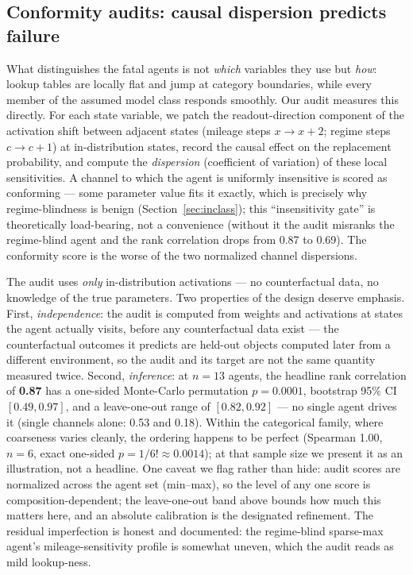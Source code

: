 \documentclass[11pt]{article}
\begin{document}
\subsection{Conformity audits: causal dispersion predicts failure}
\label{sec:audit}
What distinguishes the fatal agents is not \emph{which} variables they use
but \emph{how}: lookup tables are locally flat and jump at category
boundaries, while every member of the assumed model class responds smoothly.
Our audit measures this directly. For each state variable, we patch the
readout-direction component of the activation shift between adjacent states
(mileage steps $x \to x{+}2$; regime steps $c \to c{+}1$) at in-distribution
states, record the causal effect on the replacement probability, and compute
the \emph{dispersion} (coefficient of variation) of these local
sensitivities. A channel to which the agent is uniformly insensitive is
scored as conforming --- some parameter value fits it exactly, which is
precisely why regime-blindness is benign (Section~\ref{sec:inclass}); this
``insensitivity gate'' is theoretically load-bearing, not a convenience
(without it the audit misranks the regime-blind agent and the rank
correlation drops from 0.87 to 0.69). The conformity score is the worse of
the two normalized channel dispersions.

The audit uses \emph{only} in-distribution activations --- no counterfactual
data, no knowledge of the true parameters. Two properties of the design
deserve emphasis. First, \emph{independence}: the audit is computed from
weights and activations at states the agent actually visits, before any
counterfactual data exist --- the counterfactual outcomes it predicts are
held-out objects computed later from a different environment, so the audit
and its target are not the same quantity measured twice. Second,
\emph{inference}: at $n = 13$ agents, the headline rank correlation of
\textbf{0.87} has a one-sided Monte-Carlo permutation $p = 0.0001$,
bootstrap 95\% CI $[0.49, 0.97]$, and a leave-one-out range of
$[0.82, 0.92]$ --- no single agent drives it (single channels alone: 0.53
and 0.18). Within the categorical family, where coarseness varies cleanly,
the ordering happens to be perfect (Spearman 1.00, $n = 6$, exact one-sided
$p = 1/6! \approx 0.0014$); at that sample size we present it as an
illustration, not a headline. One caveat we flag rather than hide: audit
scores are normalized across the agent set (min--max), so the level of any
one score is composition-dependent; the leave-one-out band above bounds how
much this matters here, and an absolute calibration is the designated
refinement. The residual imperfection is honest and documented: the
regime-blind sparse-max agent's mileage-sensitivity profile is somewhat
uneven, which the audit reads as mild lookup-ness.
\end{document}
